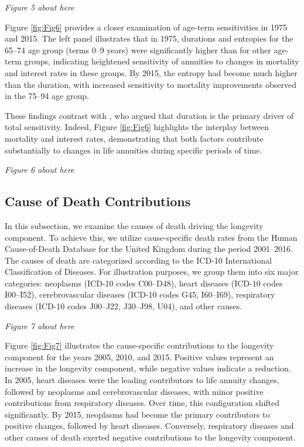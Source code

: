 \documentclass[12pt]{article}
\begin{document}
\begin{center}
	\textit{Figure 5 about here}
\end{center}

Figure \ref{fig:Fig6} provides a closer examination of age-term sensitivities in 1975 and 2015. The left panel illustrates that in 1975, durations and entropies for the 65–74 age group (terms 0–9 years) were significantly higher than for other age-term groups, indicating heightened sensitivity of annuities to changes in mortality and interest rates in these groups. By 2015, the entropy had become much higher than the duration, with increased sensitivity to mortality improvements observed in the 75–94 age group.

These findings contrast with \citet{rabitti2020mortality}, who argued that duration is the primary driver of total sensitivity. Indeed, Figure \ref{fig:Fig6} highlights the interplay between mortality and interest rates, demonstrating that both factors contribute substantially to changes in life annuities during specific periods of time.




\begin{center}
	\textit{Figure 6 about here}
\end{center}

\subsection{Cause of Death Contributions}

In this subsection, we examine the causes of death driving the longevity component. To achieve this, we utilize cause-specific death rates from the Human Cause-of-Death Database \citet{HCD2022} for the United Kingdom during the period 2001–2016. The causes of death are categorized according to the ICD-10 International Classification of Diseases. For illustration purposes, we group them into six major categories: neoplasms (ICD-10 codes C00–D48), heart diseases (ICD-10 codes I00–I52), cerebrovascular diseases (ICD-10 codes G45, I60–I69), respiratory diseases (ICD-10 codes J00–J22, J30–J98, U04), and other causes.

\begin{center}
	\textit{Figure 7 about here}
\end{center}

Figure \ref{fig:Fig7} illustrates the cause-specific contributions to the longevity component for the years 2005, 2010, and 2015. Positive values represent an increase in the longevity component, while negative values indicate a reduction. In 2005, heart diseases were the leading contributors to life annuity changes, followed by neoplasms and cerebrovascular diseases, with minor positive contributions from respiratory diseases. Over time, this configuration shifted significantly. By 2015, neoplasms had become the primary contributors to positive changes, followed by heart diseases. Conversely, respiratory diseases and other causes of death exerted negative contributions to the longevity component.
\end{document}
